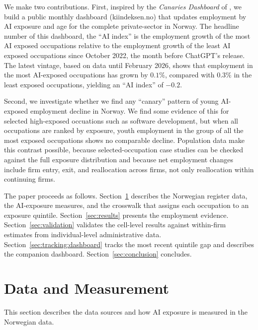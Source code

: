 \documentclass[12pt]{article}
\begin{document}
We make two contributions. 
First, inspired by the \emph{Canaries Dashboard} of \citet{stanford-indicators-canaries}, we build a public monthly dashboard (kiindeksen.no) that updates employment by AI exposure and age for the complete private-sector in Norway. The headline number of this dashboard, the ``AI index'' is the employment growth of the most AI exposed occupations relative to the employment growth of the least AI exposed occupations since October 2022, the month before ChatGPT's release. The latest vintage, based on data until February 2026, shows that employment in the most AI-exposed occupations has grown by $0.1\%$, compared with $0.3\%$ in the least exposed occupations, yielding an ``AI index'' of $-0.2$.

Second, we investigate whether we find any ``canary'' pattern of young AI-exposed employment decline in Norway. We find some evidence of this for selected high-exposed occuations such as software development, but when all occupations are ranked by exposure, youth employment in the group of all the most exposed occupations shows no comparable decline. Population data make this contrast possible, because selected-occupation case studies can be checked against the full exposure distribution and because net employment changes include firm entry, exit, and reallocation across firms, not only reallocation within continuing firms. 


The paper proceeds as follows. Section~\ref{sec:data} describes the Norwegian register data, the AI-exposure measures, and the crosswalk that assigns each occupation to an exposure quintile. Section~\ref{sec:results} presents the employment evidence. Section~\ref{sec:validation} validates the cell-level results against within-firm estimates from individual-level administrative data. Section~\ref{sec:tracking:dashboard} tracks the most recent quintile gap and describes the companion dashboard. Section~\ref{sec:conclusion} concludes.

\section{Data and Measurement}\label{sec:data}
This section describes the data sources and how AI exposure is measured in the Norwegian data.
\end{document}
